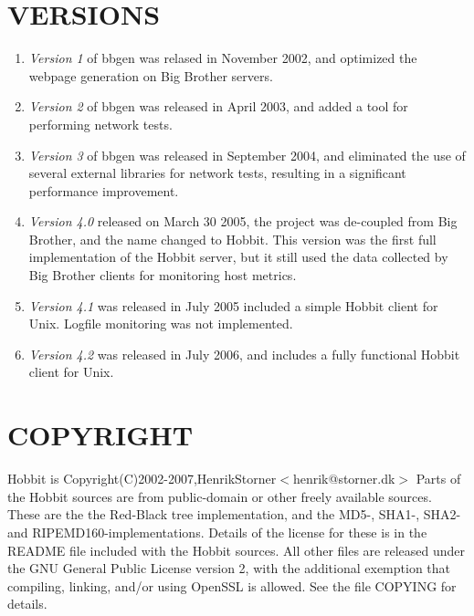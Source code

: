 \section{VERSIONS}

\begin{enumerate}

 \item \emph{Version 1} of bbgen was relased in November 2002, and optimized the
 webpage generation on Big Brother servers. 

 \item \emph{Version 2} of bbgen was released in April 2003, and added a tool for performing network tests. 

 \item \emph{Version 3} of bbgen was released in September 2004, and eliminated
 the use of several external libraries for network tests, resulting
 in a significant performance improvement. 

 \item \emph{Version 4.0 }released on March 30 2005, the project was
 de-coupled from Big Brother, and the name changed to Hobbit. This
 version was the first full implementation of the Hobbit server, but
 it still used the data collected by Big Brother clients for
 monitoring host metrics. 

 \item \emph{Version 4.1} was released in July 2005 included a simple Hobbit client for Unix. Logfile monitoring was not implemented. 


 \item \emph{Version 4.2} was released in July 2006, and includes a fully functional Hobbit client for Unix. 

\end{enumerate}
 
 
\section{COPYRIGHT}

Hobbit is Copyright(C)2002-2007,HenrikStorner$<$henrik@storner.dk$>$   
Parts of the Hobbit sources are from public-domain or other freely available
sources. These are the the Red-Black tree implementation, and the
MD5-, SHA1-, SHA2- and RIPEMD160-implementations. Details of the
license for these is in the README file included with the Hobbit
sources. All other files are released under the GNU General Public
License version 2, with the additional exemption that compiling,
linking, and/or using OpenSSL is allowed. See the file COPYING for
details. 


